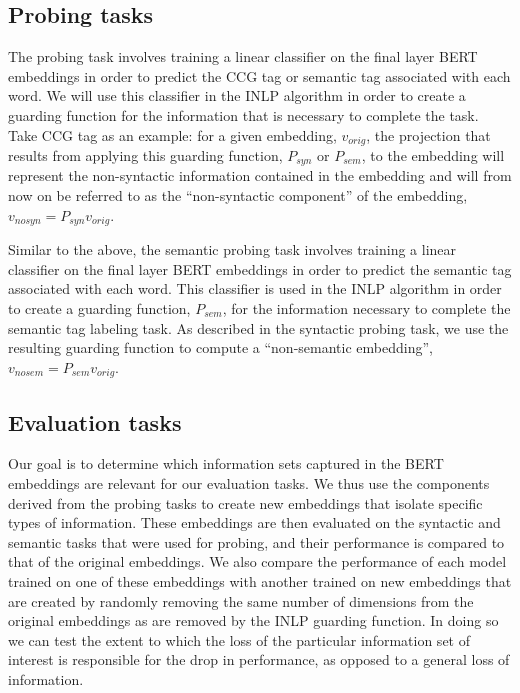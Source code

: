 \documentclass[11pt,a4paper]{article}
\begin{document}

\subsection{Probing tasks}
\label{sec:probing}
The  probing task involves training a linear classifier on the final layer BERT embeddings in order to predict the CCG tag or semantic tag associated with each word. We will use this classifier in the INLP algorithm in order to create a guarding function for the information that is necessary to complete the task. Take CCG tag as an example: for a given embedding, $v_{orig}$, the projection that results from applying this guarding function, $P_{syn}$ or $P_{sem}$, to the embedding will represent the non-syntactic information contained in the embedding and will from now on be referred to as the ``non-syntactic component'' of the embedding, $v_{no syn} = P_{syn} v_{orig}$.%


Similar to the above, the semantic probing task involves training a linear classifier on the final layer BERT embeddings in order to predict the semantic tag associated with each word. This classifier is used in the INLP algorithm in order to create a guarding function, $P_{sem}$, for the information necessary to complete the semantic tag labeling task. As described in the syntactic probing task, we use the resulting guarding function to compute a ``non-semantic embedding'', $v_{no sem} = P_{sem} v_{orig}$.


\subsection{Evaluation tasks}
\label{sec:eval}

Our goal is to determine which information sets captured in the BERT embeddings are relevant for our evaluation tasks. We thus use the components derived from the probing tasks to create new embeddings that isolate specific types of information. These embeddings are then evaluated on the syntactic and semantic tasks that were used for probing, and their performance is compared to that of the original embeddings. We also compare the performance of each model trained on one of these embeddings with another trained on new embeddings that are created by randomly removing the same number of dimensions from the original embeddings as are removed by the INLP guarding function. In doing so we can test the extent to which the loss of the particular information set of interest is responsible for the drop in performance, as opposed to a general loss of information. 
\end{document}
